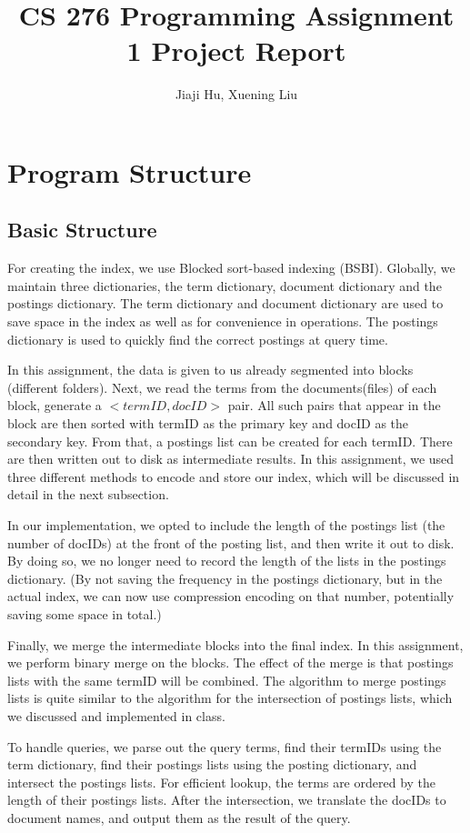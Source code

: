 \documentclass[10pt]{article}
\begin{document}
\title{CS 276 Programming Assignment 1 Project Report}
\author{Jiaji Hu, Xuening Liu}
\maketitle

\section{Program Structure}
\subsection{Basic Structure}
For creating the index, we use Blocked sort-based indexing (BSBI). Globally, we maintain three dictionaries, the term dictionary, document dictionary and the postings dictionary. The term dictionary and document dictionary are used to save space in the index as well as for convenience in operations. The postings dictionary is used to quickly find the correct postings at query time.

In this assignment, the data is given to us already segmented into blocks (different folders). Next, we read the terms from the documents(files) of each block, generate a $<termID,docID>$ pair. All such pairs that appear in the block are then sorted with termID as the primary key and docID as the secondary key. From that, a postings list can be created for each termID. There are then written out to disk as intermediate results. In this assignment, we used three different methods to encode and store our index, which will be discussed in detail in the next subsection.

In our implementation, we opted to include the length of the postings list (the number of docIDs) at the front of the posting list, and then write it out to disk. By doing so, we no longer need to record the length of the lists in the postings dictionary. (By not saving the frequency in the postings dictionary, but in the actual index, we can now use compression encoding on that number, potentially saving some space in total.)

Finally, we merge the intermediate blocks into the final index. In this assignment, we perform binary merge on the blocks. The effect of the merge is that postings lists with the same termID will be combined. The algorithm to merge postings lists is quite similar to the algorithm for the intersection of postings lists, which we discussed and implemented in class.

To handle queries, we parse out the query terms, find their termIDs using the term dictionary, find their postings lists using the posting dictionary, and intersect the postings lists. For efficient lookup, the terms are ordered by the length of their postings lists. After the intersection, we translate the docIDs to document names, and output them as the result of the query.
\end{document}
